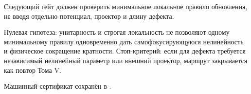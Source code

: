 Следующий гейт
должен проверить минимальное локальное правило обновления, не вводя
отдельно потенциал, проектор и длину дефекта.

Нулевая гипотеза: унитарность и строгая локальность не позволяют одному
минимальному правилу одновременно дать самофокусирующуюся нелинейность и
физическое сокращение кратности. Стоп-критерий: если для дефекта требуется
независимый нелинейный параметр или внешний проектор, маршрут закрывается
как повтор Тома V.

Машинный сертификат сохранён в
.